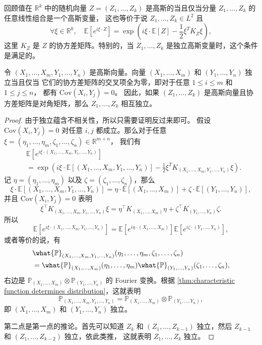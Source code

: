 回顾值在 $\mathbb{R}^k$ 中的随机向量 $Z=(Z_1,\dots,Z_k)$ 
是高斯的当且仅当分量 $Z_1,\dots,Z_k$ 的任意线性组合是一个高斯变量，
这也等价于说 $Z_1,\dots,Z_k\in L^2$ 且
\[
  \forall \xi\in \mathbb{R}^k,\quad
  \mathbb{E}[e^{i\xi\cdot Z}]=\exp\left(
    i\xi\cdot \mathbb{E}[Z]-\frac{1}{2}\xi^T K_Z\xi
  \right),
\]
这里 $K_Z$ 是 $Z$ 的协方差矩阵。特别的，当 $Z_1,\dots,Z_k$
是独立高斯变量时，这个条件是满足的。

\begin{proposition}\label{prop:gaussian independence}
  令 $(X_1,\dots,X_m,Y_1,\dots,Y_n)$ 是高斯向量。向量
  $(X_1,\dots,X_m)$ 和 $(Y_1,\dots,Y_n)$ 独立当且仅当
  它们的协方差矩阵的交叉项全为零，即对于任意 $1\leq i\leq m$ 和 $1\leq j\leq n$，
  都有 $\mathrm{Cov}(X_i,Y_j)=0$。
  因此，如果 $(Z_1,\dots,Z_k)$ 是高斯向量且协方差矩阵是对角矩阵，那么
  $Z_1,\dots,Z_k$ 相互独立。
\end{proposition}
\begin{proof}
  由于独立蕴含不相关性，所以只需要证明反过来即可。
  假设 $\mathrm{Cov}(X_i,Y_j)=0$ 对任意 $i,j$ 都成立。那么对于任意
  $\xi=(\eta_1,\dots,\eta_m,\zeta_1,\dots,\zeta_n)\in \mathbb{R}^{m+n}$，
  我们有
  \begin{align*}
    &\mathbb{E}[e^{i\xi\cdot (X_1,\dots,X_m,Y_1,\dots,Y_n)}]\\
    &=\exp\left(
      i\xi\cdot \mathbb{E}[(X_1,\dots,X_m,Y_1,\dots,Y_n)]-
      \frac{1}{2}\xi^T K_{(X_1,\dots,X_m,Y_1,\dots,Y_n)}\xi
    \right).
  \end{align*}
  记 $\eta=(\eta_1,\dots,\eta_m)$ 以及 $\zeta=(\zeta_1,\dots,\zeta_n)$，那么
  \[
    \xi\cdot \mathbb{E}[(X_1,\dots,X_m,Y_1,\dots,Y_n)]=
    \eta\cdot \mathbb{E}[(X_1,\dots,X_m)]+
    \zeta\cdot \mathbb{E}[(Y_1,\dots,Y_n)],
  \]
  并且 $\mathrm{Cov}(X_i,Y_j)=0$ 表明
  \[
    \xi^\top K_{(X_1,\dots,X_m,Y_1,\dots,Y_n)}\xi=
    \eta^\top K_{(X_1,\dots,X_m)}\eta+
    \zeta^\top K_{(Y_1,\dots,Y_n)}\zeta.
  \]
  所以
  \begin{equation*}
    \mathbb{E}[e^{i\xi\cdot (X_1,\dots,X_m,Y_1,\dots,Y_n)}]
    =\mathbb{E}[e^{i\eta\cdot (X_1,\dots,X_m)}]
    \mathbb{E}[e^{i\zeta\cdot (Y_1,\dots,Y_n)}],
  \end{equation*}
  或者等价的说，有
  \begin{align*}
    &\what{\mathbb{P}}_{(X_1,\dots,X_m,Y_1,\dots,Y_n)}(\eta_1,\dots,\eta_m,\zeta_1,\dots,\zeta_n)\\
    &=\what{\mathbb{P}}_{(X_1,\dots,X_m)}(\eta_1,\dots,\eta_m)
    \what{\mathbb{P}}_{(Y_1,\dots,Y_n)}(\zeta_1,\dots,\zeta_n),
  \end{align*}
  右边是 $\mathbb{P}_{(X_1,\dots,X_m)}\otimes \mathbb{P}_{(Y_1,\dots,Y_n)}$
  的 Fourier 变换。根据 \autoref{thm:characteristic function determines distribution}，这就表明
  \[
    \mathbb{P}_{(X_1,\dots,X_m,Y_1,\dots,Y_n)}=
    \mathbb{P}_{(X_1,\dots,X_m)}\otimes \mathbb{P}_{(Y_1,\dots,Y_n)},
  \]
  即 $(X_1,\dots,X_m)$ 和 $(Y_1,\dots,Y_n)$ 独立。

  第二点是第一点的推论。首先可以知道 $Z_k$ 和 $(Z_1,\dots,Z_{k-1})$
  独立，然后 $Z_{k-1}$ 和 $(Z_1,\dots,Z_{k-2})$ 独立，依此类推，
  这就表明 $Z_1,\dots,Z_k$ 独立。
\end{proof}

